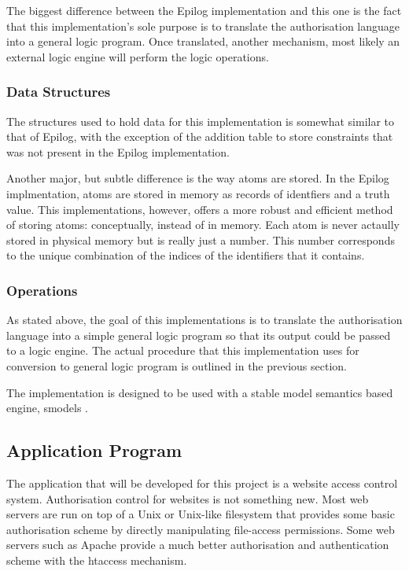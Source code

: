 \documentclass[a4paper,draft]{article}
\begin{document}
      The biggest difference between the Epilog implementation and this one
      is the fact that this implementation's sole purpose is to translate
      the authorisation language into a general logic program. Once translated,
      another mechanism, most likely an external logic engine will perform
      the logic operations.

      \subsubsection{Data Structures}

        The structures used to hold data for this implementation is somewhat
        similar to that of Epilog, with the exception of the addition table
        to store constraints that was not present in the Epilog implementation.

        Another major, but subtle difference is the way atoms are stored. In 
        the Epilog implmentation, atoms are stored in memory as records of
        identfiers and a truth value. This implementations, however, offers
        a more robust and efficient method of storing atoms: conceptually,
        instead of in memory. Each atom is never actaully stored in physical
        memory but is really just a number. This number corresponds to the
        unique combination of the indices of the identifiers that it contains.

      \subsubsection{Operations}

        As stated above, the goal of this implementations is to translate
        the authorisation language into a simple general logic program
        so that its output could be passed to a logic engine. The actual
        procedure that this implementation uses for conversion to general
        logic program is outlined in the previous section.

        The implementation is designed to be used with a stable model
        semantics based engine, smodels \cite{S}.

    \subsection{Application Program}

      The application that will be developed for this project is a website 
      access control system. Authorisation control for websites is not 
      something new. Most web servers are run on top of a Unix or Unix-like
      filesystem that provides some basic authorisation scheme by directly
      manipulating file-access permissions. Some web servers such as Apache
      provide a much better authorisation and authentication scheme with
      the htaccess mechanism.
\end{document}
